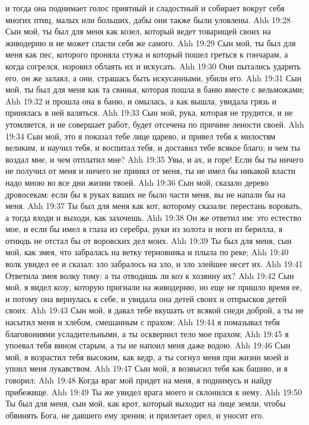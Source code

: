 и тогда она поднимает голос приятный и сладостный и собирает вокруг себя многих птиц, малых или больших, дабы они также были уловлены.
\vs Ahh 19:28
Сын мой, ты был для меня как козел, который ведет товарищей своих на живодерню и не может спасти себя же самого.
\vs Ahh 19:29
Сын мой, ты был для меня как пес, которого проняла стужа и который пошел греться к гончарам, а когда согрелся, норовил облаять их и искусать.
\vs Ahh 19:30
Они пытались ударить его, он же залаял, а они, страшась быть искусанными, убили его.
\vs Ahh 19:31
Сын мой, ты был для меня как та свинья, которая пошла в баню вместе с вельможами;
\vs Ahh 19:32
и прошла она в баню, и омылась, а как вышла, увидала грязь и принялась в ней валяться.
\vs Ahh 19:33
Сын мой, рука, которая не трудится, и не утомляется, и не совершает работ, будет отсечена по причине лености своей.
\vs Ahh 19:34
Сын мой, это я показал тебе лице царево, и привел тебя к милостям великим, и научил тебя, и воспитал тебя, и доставил тебе всякое благо; и чем ты воздал мне, и чем отплатил мне?
\vs Ahh 19:35
Увы, и ах, и горе! Если бы ты ничего не получил от меня и ничего не принял от меня, ты не имел бы никакой власти надо мною во все дни жизни твоей.
\vs Ahh 19:36
Сын мой, сказало дерево дровосекам: если бы в руках ваших не было части меня, вы не напали бы на меня.
\vs Ahh 19:37
Ты был для меня как кот, которому сказали: перестань воровать, а тогда входи и выходи, как захочешь.
\vs Ahh 19:38
Он же ответил им: это естество мое, и если бы имел я глаза из серебра, руки из золота и ноги из берилла, я отнюдь не отстал бы от воровских дел моих.
\vs Ahh 19:39
Ты был для меня, сын мой, как змея, что забралась на ветку терновника и плыла по реке;
\vs Ahh 19:40
волк увидел ее и сказал: зло забралось на зло, и зло злейшее несет их.
\vs Ahh 19:41
Ответила змея волку тому: а ты отводишь ли коз к хозяину их?
\vs Ahh 19:42
Сын мой, я видел козу, которую пригнали на живодерню, но еще не пришло время ее, и потому она вернулась к себе, и увидала она детей своих и отпрысков детей своих.
\vs Ahh 19:43
Сын мой, я давал тебе вкушать от всякой снеди доброй, а ты не насытил меня и хлебом, смешанным с прахом;
\vs Ahh 19:44
я помазывал тебя благовониями усладительными, а ты осквернил тело мое прахом;
\vs Ahh 19:45
я упоевал тебя вином старым, а ты не напоил меня даже водою.
\vs Ahh 19:46
Сын мой, я возрастил тебя высоким, как кедр, а ты согнул меня при жизни моей и упоил меня лукавством.
\vs Ahh 19:47
Сын мой, я возвысил тебя как башню, и я говорил:
\vs Ahh 19:48
Когда враг мой придет на меня, я поднимусь и найду прибежище.
\vs Ahh 19:49
Ты же увидел врага моего и склонился к нему.
\vs Ahh 19:50
Ты был для меня, сын мой, как крот, который выходит на лице земли, чтобы обвинять Бога, не давшего ему зрения; и прилетает орел, и уносит его.

